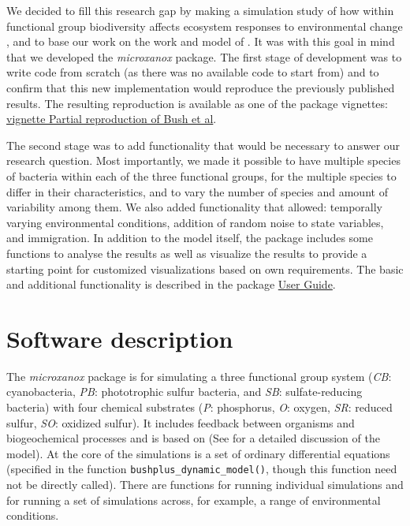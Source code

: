 \documentclass[]{elsarticle} %
\begin{document}
We decided to fill this research gap by making a simulation study of how
within functional group biodiversity affects ecosystem responses to
environmental change \citet{Limberger2022}, and to base our work on the
work and model of \citet{Bush2017}. It was with this goal in mind that
we developed the \emph{microxanox} package. The first stage of
development was to write code from scratch (as there was no available
code to start from) and to confirm that this new implementation would
reproduce the previously published results. The resulting reproduction
is available as one of the package vignettes:
\href{LINK\%20NEEDED}{vignette Partial reproduction of Bush et al}.

The second stage was to add functionality that would be necessary to
answer our research question. Most importantly, we made it possible to
have multiple species of bacteria within each of the three functional
groups, for the multiple species to differ in their characteristics, and
to vary the number of species and amount of variability among them. We
also added functionality that allowed: temporally varying environmental
conditions, addition of random noise to state variables, and
immigration. In addition to the model itself, the package includes some
functions to analyse the results as well as visualize the results to
provide a starting point for customized visualizations based on own
requirements. The basic and additional functionality is described in the
package \href{LINK_NEEDED}{User Guide}.

\hypertarget{software-description}{%
\section{Software description}\label{software-description}}

The \emph{microxanox} package is for simulating a three functional group
system (\emph{CB}: cyanobacteria, \emph{PB}: phototrophic sulfur
bacteria, and \emph{SB}: sulfate-reducing bacteria) with four chemical
substrates (\emph{P}: phosphorus, \emph{O}: oxygen, \emph{SR}: reduced
sulfur, \emph{SO}: oxidized sulfur). It includes feedback between
organisms and biogeochemical processes and is based on \citet{Bush2017}
(See \citet{Bush2017} for a detailed discussion of the model). At the
core of the simulations is a set of ordinary differential equations
(specified in the function \texttt{bushplus\_dynamic\_model()}, though
this function need not be directly called). There are functions for
running individual simulations and for running a set of simulations
across, for example, a range of environmental conditions.
\end{document}
